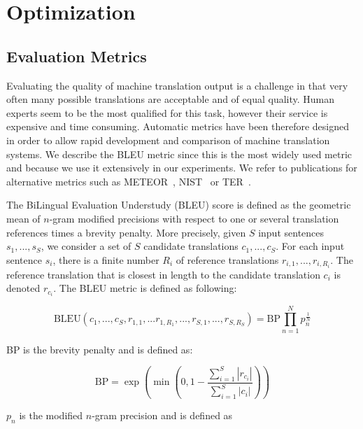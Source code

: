 \section{Optimization}
\label{sec:optimization}

    \subsection{Evaluation Metrics}

    Evaluating the quality of machine translation output is a challenge in that very often many possible
    translations are acceptable and of equal quality. Human experts seem to be the most qualified for this task, however
    their service is expensive and time consuming. Automatic metrics have been therefore designed
    in order to allow rapid development and comparison of machine translation systems. We describe
    the BLEU metric since this is the most widely used metric and because we use it extensively in our experiments.
    We refer to publications for alternative metrics such as 
    METEOR~\citep{banerjee-lavie:2005:MTSumm}, NIST~\citep{doddington:2002:HLTR} or
    TER~\citep{snover-dorr-schwartz-micciulla-makhoul:2006:AMTA}.

    The BiLingual Evaluation Understudy (BLEU) score \cite{papineni-roukos-ward-zhu:2002:ACL} is defined as 
    the geometric mean of $n$-gram modified precisions with respect
    to one or several translation references times a brevity penalty. More precisely, given $S$ input sentences
    $s_1,...,s_S$, we consider a set of $S$ candidate translations $c_1,...,c_S$. For each input sentence $s_i$, there is
    a finite number $R_i$ of reference translations $r_{i,1},...,r_{i,R_i}$. The reference translation
    that is closest in length to the candidate translation $c_i$ is denoted $r_{c_i}$. The BLEU metric is defined as following:

    \begin{equation}
      \mbox{BLEU}(c_1,...,c_S,r_{1,1},...r_{1,R_1},...,r_{S,1},...,r_{S,R_S}) = \mbox{BP} \prod_{n=1}^N p_n^{\frac{1}{N}}
    \end{equation}

    \noindent BP is the brevity penalty and is defined as:

    \begin{equation}
      \mbox{BP} = \exp(\min(0,1-\frac{\sum_{i=1}^S |r_{c_i}|}{\sum_{i=1}^S |c_i|}))
    \end{equation}

    \noindent $p_n$ is the modified $n$-gram precision and is defined as

